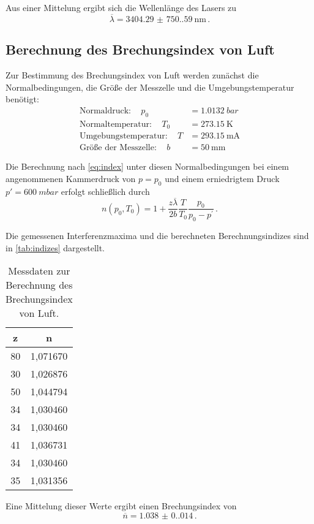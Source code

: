 Aus einer Mittelung ergibt sich die Wellenlänge des Lasers zu
\begin{equation*}
    \overline{\lambda} = \qty{3404.29(750.59)}{\nano\meter} \, .
\end{equation*}


\subsection{Berechnung des Brechungsindex von Luft}

Zur Bestimmung des Brechungsindex von Luft werden zunächst die Normalbedingungen, 
die Größe der Messzelle und die Umgebungstemperatur benötigt:
\begin{align*}
    \text{Normaldruck}          : \quad p_{0}   &= \qty{1,0132}{bar} \\
    \text{Normaltemperatur}     : \quad T_{0}   &= \qty{273,15}{\kelvin} \\
    \text{Umgebungstemperatur}  : \quad T       &= \qty{293.15}{\milli\ampere} \\
    \text{Größe der Messzelle}  : \quad b       &= \qty{50}{\milli\meter} 
\end{align*}

Die Berechnung nach \autoref{eq:index} unter diesen Normalbedingungen bei einem angenommenen Kammerdruck von $p = p_{0}$
und einem erniedrigtem Druck $p' = \qty{600}{mbar}$ erfolgt schließlich durch
\begin{equation}
    n\left(p_{0}, T_{0}\right)=1+\frac{z \overline{\lambda}}{2 b} \frac{T}{T_{0}} \frac{p_{0}}{p_{0}-p^{\prime}} \, .
\end{equation}

Die gemessenen Interferenzmaxima und die berechneten Berechnungsindizes sind in \autoref{tab:indizes} dargestellt.
\begin{table}
    \centering
    \caption{Messdaten zur Berechnung des Brechungsindex von Luft.}
    \label{tab:indizes}
    \begin{tabular}{c c}
        \toprule
           z &        n \\
        \midrule
        80 & 1,071670 \\
        30 & 1,026876 \\
        50 & 1,044794 \\
        34 & 1,030460 \\
        34 & 1,030460 \\
        41 & 1,036731 \\
        34 & 1,030460 \\
        35 & 1,031356 \\
        \bottomrule
    \end{tabular} 
\end{table}

Eine Mittelung dieser Werte ergibt einen Brechungsindex von
\begin{equation*}
    \overline{n} = \qty{1.038(0.014)} \, .
\end{equation*}